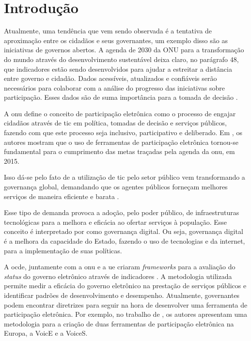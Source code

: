 \chapter[Introdução]{Introdução}
\label{cap:cap1}
Atualmente, uma tendência que vem sendo observada é a tentativa de aproximação entre os cidadãos e seus governantes, um exemplo disso são as iniciativas de governos abertos.
A agenda de 2030 da ONU para a transformação do mundo através do desenvolvimento sustentável deixa claro, no parágrafo 48, que
indicadores estão sendo desenvolvidos para ajudar a estreitar a distância entre governo e cidadão. Dados acessíveis, atualizados e confiáveis serão necessários para colaborar 
com a análise do progresso das iniciativas sobre participação. 
Esses dados são de suma importância para a tomada de decisão \cite{assembly2015transforming}.

\par
A \acrshort{onu} define o conceito de participação eletrônica como o processo de engajar cidadãos através de \acrfull{tic} em política, tomadas de decisão e
serviços públicos, fazendo com que este processo seja inclusivo, participativo e deliberado. Em , os autores mostram que o uso de 
ferramentas de participação eletrônica tornou-se fundamental para o cumprimento das metas traçadas pela agenda da \acrshort{onu}, em 2015. 

\par
Isso dá-se pelo fato de a utilização de \acrshort{tic} pelo setor público vem transformando a governança global, demandando que os agentes públicos forneçam melhores serviços 
de maneira eficiente e barata \cite{afdb2014uneca}. 

\par
Esse tipo de demanda provoca a adoção, pelo poder público, de infraestruturas tecnológicas para a melhora e eficácia ao ofertar serviços à população. Esse conceito é interpretado
por  como governança digital. Ou seja, governança digital é a melhora da capacidade do Estado, fazendo o uso de tecnologias e da internet, 
para a implementação de suas políticas.

\par
A \acrfull{ocde}, juntamente com a \acrshort{onu} e a \acrfull{ue} criaram \textit{frameworks} para a avaliação do \textit{status} do governo eletrônico através de indicadores \cite{onu2018}. A metodologia utilizada permite medir a eficácia do governo eletrônico na prestação de serviços públicos e identificar padrões de desenvolvimento e desempenho.
Atualmente, governantes podem encontrar diretrizes para seguir na hora de desenvolver uma ferramenta de participação eletrônica. 
Por exemplo,  no trabalho de , os autores apresentam uma metodologia para a criação de duas ferramentas de participação eletrônica na Europa, a VoicE e a VoiceS.

